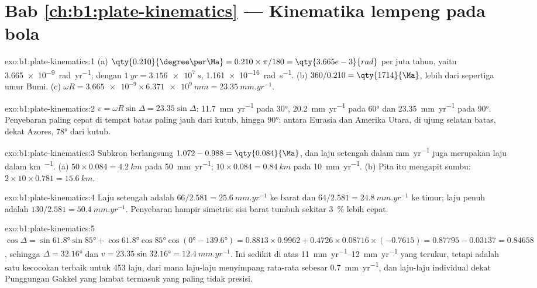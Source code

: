 \section*{Bab \ref{ch:b1:plate-kinematics} --- Kinematika lempeng pada bola}

\begin{solution}{exo:b1:plate-kinematics:1}
(a) $\qty{0.210}{\degree\per\Ma} = 0.210\times\pi/180 = \qty{3.665e-3}{rad}$
per juta tahun, yaitu \qty{3.665e-9}{rad.yr^{-1}}; dengan
$\qty{1}{yr} = \qty{3.156e7}{s}$, \qty{1.161e-16}{rad.s^{-1}}. (b) $360/0.210 =
\qty{1714}{\Ma}$, lebih dari sepertiga umur Bumi. (c) $\omega R =
\num{3.665e-9}\times\qty{6.371e9}{mm} = \qty{23.35}{mm.yr^{-1}}$.
\end{solution}

\begin{solution}{exo:b1:plate-kinematics:2}
$v = \omega R\sin\Delta = 23.35\sin\Delta$: \qty{11.7}{mm.yr^{-1}} pada \ang{30},
\qty{20.2}{mm.yr^{-1}} pada \ang{60} dan \qty{23.35}{mm.yr^{-1}} pada \ang{90}. Penyebaran paling cepat di tempat batas paling jauh dari kutub, hingga
\ang{90}: antara Eurasia dan Amerika Utara, di ujung selatan batas,
dekat Azores, \ang{78} dari kutub.
\end{solution}

\begin{solution}{exo:b1:plate-kinematics:3}
Subkron berlangsung $1.072 - 0.988 = \qty{0.084}{\Ma}$, dan laju setengah dalam
\unit{mm.yr^{-1}} juga merupakan laju dalam \unit{km\per\Ma}. (a) $50\times0.084 =
\qty{4.2}{km}$ pada \qty{50}{mm.yr^{-1}}; $10\times0.084 = \qty{0.84}{km}$ pada
\qty{10}{mm.yr^{-1}}. (b) Pita itu mengapit sumbu:
$2\times10\times0.781 = \qty{15.6}{km}$.
\end{solution}

\begin{solution}{exo:b1:plate-kinematics:4}
Laju setengah adalah $66/2.581 = \qty{25.6}{mm.yr^{-1}}$ ke barat dan
$64/2.581 = \qty{24.8}{mm.yr^{-1}}$ ke timur; laju penuh adalah
$130/2.581 = \qty{50.4}{mm.yr^{-1}}$. Penyebaran
hampir simetris: sisi barat tumbuh sekitar
\qty{3}{\percent} lebih cepat.
\end{solution}

\begin{solution}{exo:b1:plate-kinematics:5}
$\cos\Delta = \sin\ang{61.8}\sin\ang{85} + \cos\ang{61.8}\cos\ang{85}
\cos(\ang{0} - \ang{139.6}) = 0.8813\times0.9962 + 0.4726\times0.08716\times
(-0.7615) = 0.87795 - 0.03137 = 0.84658$, sehingga $\Delta = \ang{32.16}$ dan
$v = 23.35\sin\ang{32.16} = \qty{12.4}{mm.yr^{-1}}$. Ini sedikit di atas
\qtyrange{11}{12}{mm.yr^{-1}} yang terukur, tetapi  adalah satu kecocokan terbaik untuk 453 laju, dari mana laju-laju menyimpang rata-rata sebesar \qty{0.7}{mm.yr^{-1}}, dan laju-laju individual dekat Punggungan Gakkel yang lambat termasuk yang paling tidak presisi.
\end{solution}

